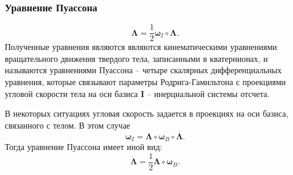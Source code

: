 \documentclass[utf8]{beamer}
\begin{document}
\begin{frame}
\frametitle{Уравнение Пуассона}
$$
\dot{\mathbf{\Lambda}} =
\frac{1}{2}\mathbf{\omega}_I\circ\mathbf{\Lambda}.
$$
Полученные уравнения являются являются кинематическими уравнениями
вращательного движения твердого тела, записанными в кватернионах, и называются
уравнениями Пуассона -- четыре скалярных дифференциальных уравнения, которые
связывают параметры Родрига-Гамильтона с проекциями угловой скорости тела
на оси базиса $\mathbf{I}$ -- инерциальной системы отсчета.

В некоторых ситуациях угловая скорость задается в проекциях на оси базиса,
связанного с телом. В этом случае
$$
\mathbf{\omega}_I =
\mathbf{\Lambda}\circ\mathbf{\omega}_B\circ\overline{\mathbf{\Lambda}}.
$$
Тогда уравнение Пуассона имеет иной вид:
$$
\dot{\mathbf{\Lambda}} = \frac{1}{2}\mathbf{\Lambda}\circ\mathbf{\omega}_B.
$$
\end{frame}
\end{document}
